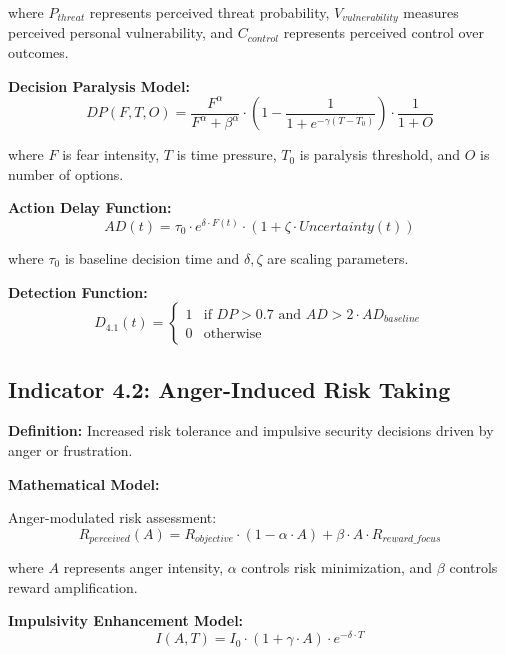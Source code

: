 \documentclass[11pt,a4paper]{article}
\begin{document}
where $P_{threat}$ represents perceived threat probability, $V_{vulnerability}$ measures perceived personal vulnerability, and $C_{control}$ represents perceived control over outcomes.

\textbf{Decision Paralysis Model:}
\begin{equation}
DP(F,T,O) = \frac{F^{\alpha}}{F^{\alpha} + \beta^{\alpha}} \cdot \left(1 - \frac{1}{1 + e^{-\gamma(T - T_0)}}\right) \cdot \frac{1}{1 + O}
\end{equation}

where $F$ is fear intensity, $T$ is time pressure, $T_0$ is paralysis threshold, and $O$ is number of options.

\textbf{Action Delay Function:}
\begin{equation}
AD(t) = \tau_0 \cdot e^{\delta \cdot F(t)} \cdot \left(1 + \zeta \cdot Uncertainty(t)\right)
\end{equation}

where $\tau_0$ is baseline decision time and $\delta, \zeta$ are scaling parameters.

\textbf{Detection Function:}
\begin{equation}
D_{4.1}(t) = \begin{cases}
1 & \text{if } DP > 0.7 \text{ and } AD > 2 \cdot AD_{baseline} \\
0 & \text{otherwise}
\end{cases}
\end{equation}

\subsection{Indicator 4.2: Anger-Induced Risk Taking}

\textbf{Definition:} Increased risk tolerance and impulsive security decisions driven by anger or frustration.

\textbf{Mathematical Model:}

Anger-modulated risk assessment:
\begin{equation}
R_{perceived}(A) = R_{objective} \cdot (1 - \alpha \cdot A) + \beta \cdot A \cdot R_{reward\_focus}
\end{equation}

where $A$ represents anger intensity, $\alpha$ controls risk minimization, and $\beta$ controls reward amplification.

\textbf{Impulsivity Enhancement Model:}
\begin{equation}
I(A,T) = I_0 \cdot \left(1 + \gamma \cdot A\right) \cdot e^{-\delta \cdot T}
\end{equation}
\end{document}
